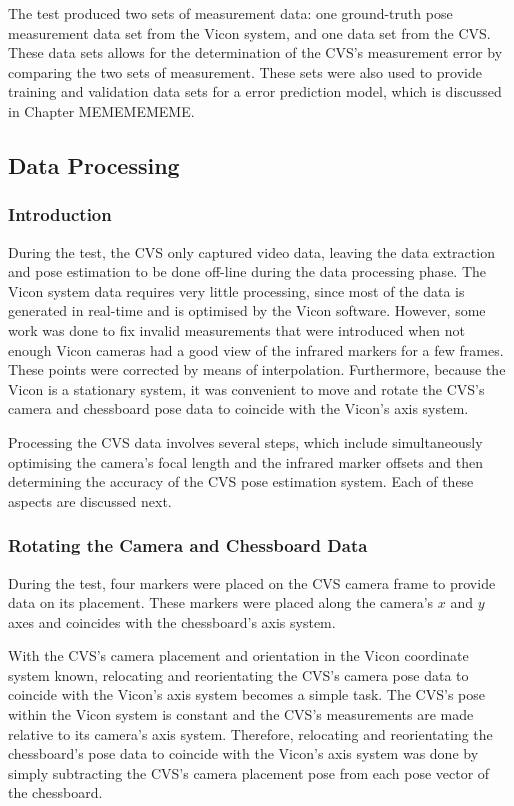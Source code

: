 The test produced two sets of measurement data: one ground-truth pose measurement data set from the Vicon system, and one data set from the CVS\@. These data sets allows for the determination of the CVS's measurement error by comparing the two sets of measurement. These sets were also used to provide training and validation data sets for a error prediction model, which is discussed in Chapter MEMEMEMEME.\@

\subsection{Data Processing}

\subsubsection{Introduction}

During the test, the CVS only captured video data, leaving the data extraction and pose estimation to be done off-line during the data processing phase. The Vicon system data requires very little processing, since most of the data is generated in real-time and is optimised by the Vicon software. However, some work was done to fix invalid measurements that were introduced when not enough Vicon cameras had a good view of the infrared markers for a few frames. These points were corrected by means of interpolation. Furthermore, because the Vicon is a stationary system, it was convenient to move and rotate the CVS's camera and chessboard pose data to coincide with the Vicon's axis system.

Processing the CVS data involves several steps, which include simultaneously optimising the camera's focal length and the infrared marker offsets and then determining the accuracy of the CVS pose estimation system. Each of these aspects are discussed next.

\subsubsection{Rotating the Camera and Chessboard Data}
\label{sec:rotate-axes}

During the test, four markers were placed on the CVS camera frame to provide data on its placement. These markers were placed along the camera's $x$ and $y$ axes and coincides with the chessboard's axis system. 

With the CVS's camera placement and orientation in the Vicon coordinate system known, relocating and reorientating the CVS's camera pose data to coincide with the Vicon's axis system becomes a simple task. The CVS's pose within the Vicon system is constant and the CVS's measurements are made relative to its camera's axis system. Therefore, relocating and reorientating the chessboard's pose data to coincide with the Vicon's axis system was done by simply subtracting the CVS's camera placement pose from each pose vector of the chessboard.

